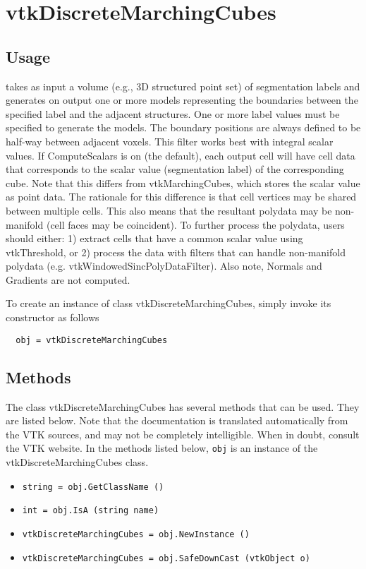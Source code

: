 \section{vtkDiscreteMarchingCubes}

\subsection{Usage}

 takes as input a volume (e.g., 3D structured point set) of
 segmentation labels and generates on output one or more
 models representing the boundaries between the specified label and
 the adjacent structures.  One or more label values must be specified to
 generate the models.  The boundary positions are always defined to
 be half-way between adjacent voxels. This filter works best with
 integral scalar values.
 If ComputeScalars is on (the default), each output cell will have
 cell data that corresponds to the scalar value (segmentation label)
 of the corresponding cube. Note that this differs from vtkMarchingCubes,
 which stores the scalar value as point data. The rationale for this
 difference is that cell vertices may be shared between multiple
 cells. This also means that the resultant polydata may be
 non-manifold (cell faces may be coincident). To further process the
 polydata, users should either: 1) extract cells that have a common
 scalar value using vtkThreshold, or 2) process the data with
 filters that can handle non-manifold polydata
 (e.g. vtkWindowedSincPolyDataFilter).
 Also note, Normals and Gradients are not computed.

To create an instance of class vtkDiscreteMarchingCubes, simply
invoke its constructor as follows
\begin{verbatim}
  obj = vtkDiscreteMarchingCubes
\end{verbatim}
\subsection{Methods}

The class vtkDiscreteMarchingCubes has several methods that can be used.
  They are listed below.
Note that the documentation is translated automatically from the VTK sources,
and may not be completely intelligible.  When in doubt, consult the VTK website.
In the methods listed below, \verb|obj| is an instance of the vtkDiscreteMarchingCubes class.
\begin{itemize}
\item  \verb|string = obj.GetClassName ()|

\item  \verb|int = obj.IsA (string name)|

\item  \verb|vtkDiscreteMarchingCubes = obj.NewInstance ()|

\item  \verb|vtkDiscreteMarchingCubes = obj.SafeDownCast (vtkObject o)|

\end{itemize}

